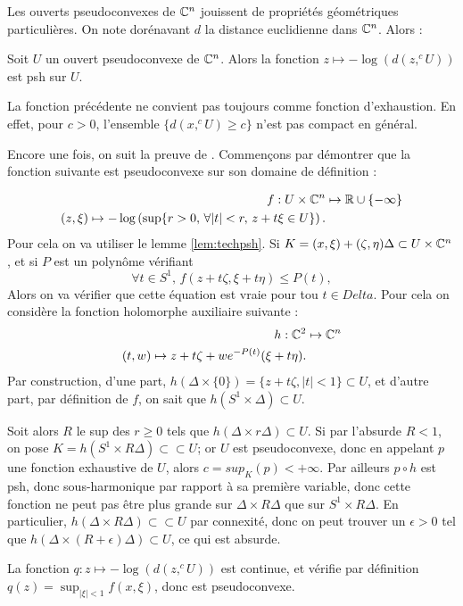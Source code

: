 Les ouverts pseudoconvexes de $\mathbb{C}^n$ jouissent de propriétés géométriques particulières. On note dorénavant $d$ la distance euclidienne dans $\mathbb{C}^n$. Alors :
\begin{prop}
	Soit $U$ un ouvert pseudoconvexe de $\mathbb{C}^n$. Alors la fonction $z \mapsto -\log(d(z,^cU))$ est psh sur $U$.
\end{prop}
\begin{rem}
	La fonction précédente ne convient pas toujours comme fonction d'exhaustion. En effet, pour $c > 0$, l'ensemble $\{d(x,^cU) \geq c\}$ n'est pas compact en général.
\end{rem}
\begin{preuve}
	Encore une fois, on suit la preuve de \cite{demailly1997complex}. Commençons par démontrer que la fonction suivante est pseudoconvexe sur son domaine de définition :
	
\begin{align*}
	f: U \times \mathbb{C}^n &\mapsto \mathbb{R}\cup \{-\infty \}\\
	(z,\xi) \mapsto -\log \left(\sup\{r >0,\,\forall |t| < r,\,z+t\xi \in U \} \right).
\end{align*}
Pour cela on va utiliser le lemme \ref{lem:techpsh}. Si $K=(x,\xi)+(\zeta, \eta)\Delta \subset U \times \mathbb{C}^n$, et si $P$ est un polynôme vérifiant
\begin{equation*}
	\forall t \in S^1,\,f(z+t\zeta,\xi+t\eta) \leq P(t),
\end{equation*}
Alors on va vérifier que cette équation est vraie pour tou $t \in Delta$. Pour cela on considère la fonction holomorphe auxiliaire suivante :
\begin{align*}
	h:\mathbb{C}^2 &\mapsto \mathbb{C}^n\\
	(t,w)\mapsto z+t\zeta + we^{-P(t)}(\xi+t\eta).
\end{align*}
Par construction, d'une part, $h(\Delta \times \{0\}) = \{z+t\zeta,|t| <1 \} \subset U$, et d'autre part, par définition de $f$, on sait que $h(S^1 \times \Delta) \subset U$.

Soit alors $R$ le sup des $r \geq 0$ tels que $h(\Delta \times r\Delta) \subset U$. Si par l'absurde $R<1$, on pose $K=h(S^1 \times R\Delta) \subset \subset U$; or $U$ est pseudoconvexe, donc en appelant $p$ une fonction exhaustive de $U$, alors $c=sup_K(p)<+\infty$. Par ailleurs $p\circ h$ est psh, donc sous-harmonique par rapport à sa première variable, donc cette fonction ne peut pas être plus grande sur $\Delta \times R\Delta$ que sur $S^1 \times R\Delta$. En particulier, $h(\Delta \times R\Delta) \subset \subset U$ par connexité, donc on peut trouver un $\epsilon>0$ tel que $h(\Delta \times (R+\epsilon)\Delta) \subset U$, ce qui est absurde.

La fonction $q:z \mapsto -\log(d(z,^cU))$ est continue, et vérifie par définition $q(z)=\sup_{|\xi|<1}f(x,\xi)$, donc est pseudoconvexe.
\end{preuve}

